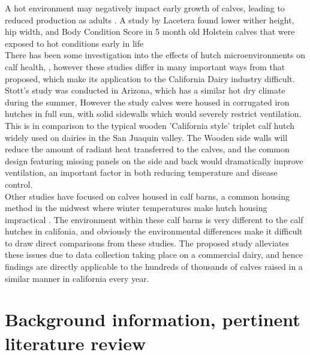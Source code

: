 \documentclass[12pt]{article}
\begin{document}
\begin{itemize}
	A hot environment may negatively impact early growth of calves, leading to reduced production as adults \cite{Hoffman1997}. A study by Lacetera found lower wither height, hip width, and Body Condition Score in 5 month old Holstein calves that were exposed to hot conditions early in life \cite{lacetera1994} \\
	There has been some investigation into the effects of hutch microenvironments on calf health, \cite{Stott1976,Nordlund2008,Lago2006}, however these studies differ  in many important ways from that proposed, which make its application to the California Dairy industry difficult. 
	Stott's study was conducted in Arizona, which has a similar hot dry climate during the summer, However the study calves were housed in corrugated iron hutches in full sun, with solid sidewalls which would severely restrict ventilation\cite{Stott1976}. This is in comparison to the typical wooden 'California style' triplet calf hutch widely used on dairies in the San Juaquin valley. The Wooden side walls will reduce the amount of radiant heat transferred to the calves, and the common design featuring missing panels on the side and back would dramatically improve ventilation, an important factor in both reducing temperature and disease control\cite{Smith2002a}.\\
	Other studies have focused on calves housed in calf barns, a common housing method in the midwest where winter temperatures make hutch housing impractical \cite{Lago2006}. The environment within these calf barns is very different to the calf hutches in califonia, and obviously the environmental differences make it difficult to draw direct comparisons from these studies.
	The proposed study alleviates these issues due to data collection taking place on a commercial dairy, and hence findings are directly applicable to the hundreds of thousands of calves raised in a similar manner in california every year. %

	\section{Background information, pertinent literature review}



\end{itemize}
\end{document}
